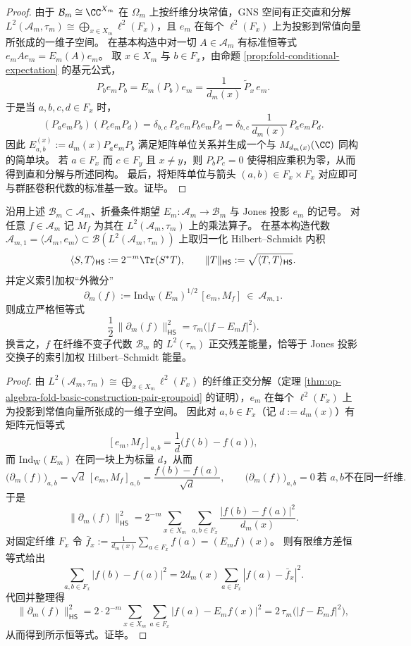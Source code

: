 \begin{proof}
由于 \(\mathcal B_m\cong \CC^{X_m}\) 在 \(\Omega_m\) 上按纤维分块常值，GNS 空间有正交直和分解
\(
L^2(\mathcal A_m,\tau_m)\cong \bigoplus_{x\in X_m}\ell^2(F_x)
\)，且 \(e_m\) 在每个 \(\ell^2(F_x)\) 上为投影到常值向量所张成的一维子空间。
在基本构造中对一切 \(A\in\mathcal A_m\) 有标准恒等式 \(e_mAe_m=E_m(A)e_m\)。
取 \(x\in X_m\) 与 \(b\in F_x\)，由命题 \ref{prop:fold-conditional-expectation} 的基元公式，
\[
P_b e_m P_b
=E_m(P_b)e_m
=\frac{1}{d_m(x)}\,\widetilde P_x\,e_m.
\]
于是当 \(a,b,c,d\in F_x\) 时，
\[
(P_a e_m P_b)(P_c e_m P_d)
=\delta_{b,c}\,P_a e_m P_b e_m P_d
=\delta_{b,c}\,\frac{1}{d_m(x)}\,P_a e_m P_d.
\]
因此 \(E^{(x)}_{a,b}:=d_m(x)P_a e_m P_b\) 满足矩阵单位关系并生成一个与 \(M_{d_m(x)}(\CC)\) 同构的简单块。
若 \(a\in F_x\) 而 \(c\in F_y\) 且 \(x\neq y\)，则 \(P_bP_c=0\) 使得相应乘积为零，从而得到直和分解与所述同构。
最后，将矩阵单位与箭头 \((a,b)\in F_x\times F_x\) 对应即可与群胚卷积代数的标准基一致。证毕。
\end{proof}

\begin{proposition}\label{prop:op-algebra-fold-index-weighted-commutator-energy}
沿用上述 \(\mathcal B_m\subset\mathcal A_m\)、折叠条件期望 \(E_m:\mathcal A_m\to\mathcal B_m\) 与 Jones 投影 \(e_m\) 的记号。
对任意 \(f\in\mathcal A_m\) 记 \(M_f\) 为其在 \(L^2(\mathcal A_m,\tau_m)\) 上的乘法算子。
在基本构造代数 \(\mathcal A_{m,1}=\langle\mathcal A_m,e_m\rangle\subset\mathcal B(L^2(\mathcal A_m,\tau_m))\) 上取归一化 Hilbert--Schmidt 内积
\[
\langle S,T\rangle_{\mathsf{HS}}
:=2^{-m}\Tr(S^\ast T),
\qquad
\|T\|_{\mathsf{HS}}:=\sqrt{\langle T,T\rangle_{\mathsf{HS}}}.
\]
并定义索引加权“外微分”
\[
\partial_m(f):=\mathrm{Ind}_{\mathrm W}(E_m)^{1/2}\,[e_m,M_f]\ \in\ \mathcal A_{m,1}.
\]
则成立严格恒等式
\[
\boxed{\;\frac12\,\|\partial_m(f)\|_{\mathsf{HS}}^{2}=\tau_m\!\bigl(|f-E_m f|^2\bigr).\;}
\]
换言之，\(f\) 在纤维不变子代数 \(\mathcal B_m\) 的 \(L^2(\tau_m)\) 正交残差能量，恰等于 Jones 投影交换子的索引加权 Hilbert--Schmidt 能量。
\end{proposition}
\begin{proof}
由 \(L^2(\mathcal A_m,\tau_m)\cong\bigoplus_{x\in X_m}\ell^2(F_x)\) 的纤维正交分解（定理 \ref{thm:op-algebra-fold-basic-construction-pair-groupoid} 的证明），\(e_m\) 在每个 \(\ell^2(F_x)\) 上为投影到常值向量所张成的一维子空间。
因此对 \(a,b\in F_x\)（记 \(d:=d_m(x)\)）有矩阵元恒等式
\[
[e_m,M_f]_{a,b}=\frac{1}{d}\bigl(f(b)-f(a)\bigr),
\]
而 \(\mathrm{Ind}_{\mathrm W}(E_m)\) 在同一块上为标量 \(d\)，从而
\[
\bigl(\partial_m(f)\bigr)_{a,b}=\sqrt d\,[e_m,M_f]_{a,b}=\frac{f(b)-f(a)}{\sqrt d},
\qquad
\bigl(\partial_m(f)\bigr)_{a,b}=0\ \text{若 }a,b\text{不在同一纤维}.
\]
于是
\[
\|\partial_m(f)\|_{\mathsf{HS}}^2
=2^{-m}\sum_{x\in X_m}\ \sum_{a,b\in F_x}\frac{|f(b)-f(a)|^2}{d_m(x)}.
\]
对固定纤维 \(F_x\) 令
\(
\bar f_x:=\frac1{d_m(x)}\sum_{a\in F_x}f(a)=(E_m f)(x)
\)。
则有限维方差恒等式给出
\[
\sum_{a,b\in F_x}|f(b)-f(a)|^2
=2d_m(x)\sum_{a\in F_x}|f(a)-\bar f_x|^2.
\]
代回并整理得
\[
\|\partial_m(f)\|_{\mathsf{HS}}^2
=2\cdot 2^{-m}\sum_{x\in X_m}\sum_{a\in F_x}|f(a)-E_m f(x)|^2
=2\,\tau_m\!\bigl(|f-E_m f|^2\bigr),
\]
从而得到所示恒等式。证毕。
\end{proof}

